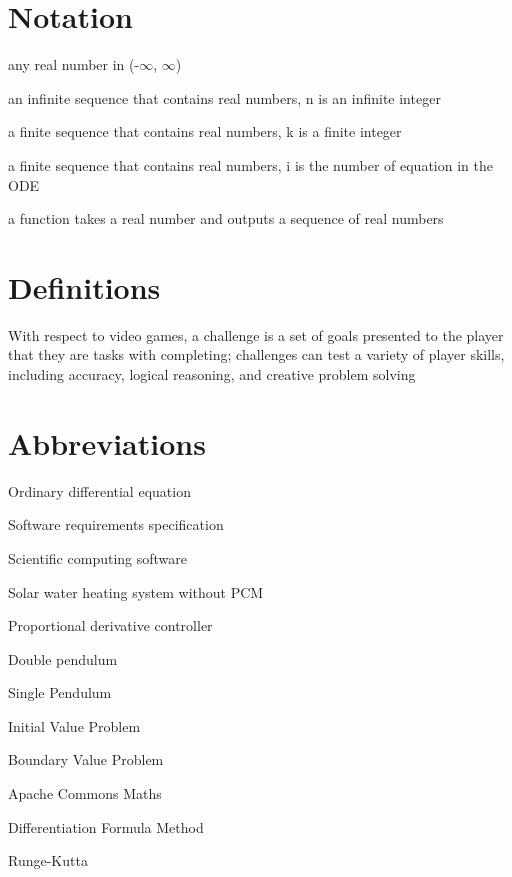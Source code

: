 
\section*{Notation}
\begin{description}[font=\rmfamily\bfseries, leftmargin=3.5cm, style=nextline]
	\item[$\mathbb{R}$] any real number in (-$\infty$, $\infty$)
	\item[$\mathbb{R}^n$] an infinite sequence that contains real numbers, n is an infinite integer
	\item[$\mathbb{R}^k$] a finite sequence that contains real numbers, k is a finite integer
	\item[$\mathbb{R}^i$] a finite sequence that contains real numbers, i is the number of equation in the ODE
	\item[$\mathbb{R} \rightarrow \mathbb{R}^i$] a function takes a real number and outputs a sequence of real numbers
\end{description}

\section*{Definitions}
\begin{description}[font=\rmfamily\bfseries, leftmargin=3.5cm, style=nextline]
	\item[Challenge] With respect to video games, a challenge is a set of goals presented to the player that they are tasks with completing; challenges can test a variety of player skills, including accuracy, logical reasoning, and creative problem solving
\end{description}

\section*{Abbreviations}
\begin{description}[font=\rmfamily\bfseries, leftmargin=3.5cm, style=nextline]
	\item[ODE] Ordinary differential equation
	\item[SRS] Software requirements specification
	\item[SCS] Scientific computing software
	\item[NoPCM] Solar water heating system without PCM
	\item[PDController] Proportional derivative controller
	\item[DblPendulum] Double pendulum
	\item[SglPendulum] Single Pendulum
	\item[IVP] Initial Value Problem
	\item[BVP] Boundary Value Problem
	\item[ACM] Apache Commons Maths
	\item[BDF] Differentiation Formula Method
	\item[RK] Runge-Kutta
\end{description}